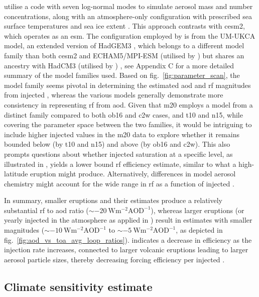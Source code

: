 \documentclass{ametsocV6.1}
\newcommand{\iso}[1][i]{{#1}njected \ce{SO2}}
\begin{document}
\citet{marshall2019, marshall2020, marshall2021} utilise a code with seven log-normal
modes to simulate aerosol mass and number concentrations, along with an atmosphere-only
configuration with prescribed sea surface temperatures and sea ice extent
\citep{marshall2019}. This approach contrasts with \gls{cesm2}, which operates as an
\gls{esm}. The configuration employed by \citet{marshall2019} is from the UM-UKCA model,
an extended version of HadGEM3 \citep{dhomse2014}, which belongs to a different model
family than both \gls{cesm2} and ECHAM5/MPI-ESM (utilised by \citet{timmreck2010,
  niemeier2015}) but shares an ancestry with HadCM3 (utilised by \citet{gregory2016})
\citep{kuma2023}, see Appendix C for a more detailed summary of the model families used.
Based on fig.~\ref{fig:parameter_scan}, the model family seems pivotal in determining
the estimated \gls{aod} and \gls{rf} magnitudes from \iso{}, whereas the various models
generally demonstrate more consistency in representing \gls{rf} from \gls{aod}. Given
that \gls{m20} employs a model from a distinct family compared to both \gls{ob16} and
\gls{c2w} cases, and \gls{t10} and \gls{n15}, while covering the parameter space between
the two families, it would be intriguing to include higher \iso{} values in the
\gls{m20} data to explore whether it remains bounded below (by \gls{t10} and \gls{n15})
and above (by \gls{ob16} and \gls{c2w}). This also prompts questions about whether
\iso{} saturation at a specific level, as illustrated in \citet{niemeier2015}, yields a
lower bound \gls{rf} efficiency estimate, similar to what a high-latitude eruption might
produce. Alternatively, differences in model aerosol chemistry might account for the
wide range in \gls{rf} as a function of \iso{}.

In summary, smaller eruptions and their estimates produce a relatively substantial
\gls{rf} to \gls{aod} ratio (\(\sim \SI{-20}{\watt\metre^{-2}\mathrm{AOD}^{-1}}\)),
whereas larger eruptions (or yearly \iso{} in the atmosphere as applied in
\citet{niemeier2015}) result in estimates with smaller magnitudes (\(\sim
\SI{-10}{\watt\metre^{-2}\mathrm{AOD}^{-1}}\) to \(\sim
\SI{-5}{\watt\metre^{-2}\mathrm{AOD}^{-1}}\), as depicted in
fig.~\ref{fig:aod_vs_toa_avg_loop_ratios}). \citet{niemeier2017} indicates a decrease in
efficiency as the injection rate increases, connected to larger volcanic eruptions
leading to larger aerosol particle sizes, thereby decreasing forcing efficiency per
\iso{} \citep{english2013, timmreck2018}.

\subsection{Climate sensitivity estimate}
\end{document}
